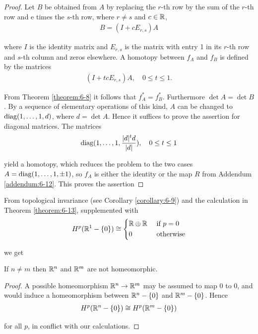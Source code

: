 \begin{proof}
  Let $B$ be obtained from $A$ by replacing the $r$-th row by the sum of the
$r$-th row and e times the $s$-th row, where $r \neq s$ and $c\in{\ensuremath{\mathbb{R}}}$,
\begin{align*}
  B = (I + cE_{r, s})A
\end{align*}

where $I$ is the identity matrix and $E_{r,s}$ is the matrix with entry 1 in its $r$-th row
and $s$-th column and zeros elsewhere. A homotopy between $f_A$ and $f_B$ is defined
by the matrices
\begin{align*}
  (I+tcE_{r, s})A, \quad 0\le t\le 1.
\end{align*}

From Theorem \ref{theorem:6-8} it follows that $f_A^* = f_B^*$. Furthermore $\det A = \det B$.
By a sequence of elementary operations of this kind, $A$ can be changed to
$\mathrm{diag} (1, \ldots, 1, d)$, where $d =\det A$. Hence it suffices to prove the assertion for
diagonal matrices. The matrices
\begin{align*}
  \mathrm{diag}(1, \ldots, 1, \frac{|d|^td}{|d|}), \quad 0\le t\le 1
\end{align*}

yield a homotopy, which reduces the problem to the two cases $A = \mathrm{diag} (1, \ldots, 1, \pm 1)$, so $f_A$ is 
either the identity or the map $R$ from Addendum \ref{addendum:6-12}. This proves the assertion
\end{proof}


From topological invariance (see Corollary \ref{corollary:6-9}) and the calculation in Theorem
\ref{theorem:6-13}, supplemented with
\begin{align*}
  H^p({\mathbb{R}}^1 - \{0\}) \cong \left\{\begin{aligned}
    & {\mathbb{R}}\oplus{\ensuremath{\mathbb{R}}} && \text{ if } p=0\\
    & 0 && \text{ otherwise}
  \end{aligned}\right.
\end{align*}

we get 
\begin{proposition}\label{proposition:6-15}
  If $n \neq m$ then ${\mathbb{R}}^n$ and ${\mathbb{R}}^m$ are not homeomorphic.
\end{proposition}

\begin{proof}
  A possible homeomorphism ${\mathbb{R}}^n\to{\ensuremath{\mathbb{R}}}^m$ may be assumed to map 0 to 0, and would induce a homeomorphism 
  between ${\mathbb{R}}^n-\{0\}$ and ${\mathbb{R}}^m-\{0\}$. Hence
  \begin{align*}
    H^p({\mathbb{R}}^n - \{0\}) \cong H^p({\mathbb{R}}^m - \{0\})
  \end{align*}

  for all $p$, in conflict with our calculations.
\end{proof}

